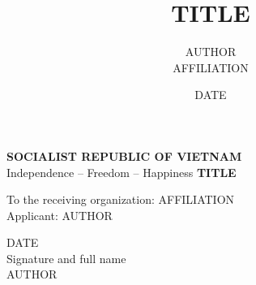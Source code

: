 \documentclass{article}
\title{{{TITLE}}}
\author{{{AUTHOR}} \\ {{AFFILIATION}}}
\date{{{DATE}}}
\begin{document}
\begin{center}\textbf{SOCIALIST REPUBLIC OF VIETNAM}\\ Independence -- Freedom -- Happiness
\vspace{1cm}
\Large\textbf{{{TITLE}}}\end{center}
To the receiving organization: {{AFFILIATION}}\\
Applicant: {{AUTHOR}}

\begin{flushright}{{DATE}}\\Signature and full name\\[1.5cm]{{AUTHOR}}\end{flushright}
\end{document}
